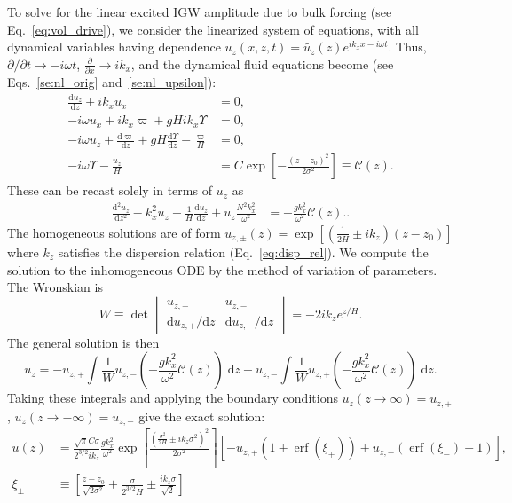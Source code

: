\documentclass[
        fleqn,
        usenatbib,
    ]{mnras}
\newcommand*{\rd}[2]{\frac{\mathrm{d}#1}{\mathrm{d}#2}}
\newcommand*{\rtd}[2]{\frac{\mathrm{d}^2#1}{\mathrm{d}#2^2}}
\newcommand*{\pd}[2]{\frac{\partial#1}{\partial#2}}
\newcommand*{\pdil}[2]{\partial#1/\partial#2}
\newcommand*{\rdil}[2]{\mathrm{d}#1/\mathrm{d}#2}
\newcommand*{\p}[1]{\left(#1\right)}
\newcommand*{\s}[1]{\left[#1\right]}
\DeclareMathOperator*{\erf}{erf}
\begin{document}
To solve for the linear excited IGW amplitude due to bulk forcing (see
Eq.~\eqref{eq:vol_drive}), we consider the linearized system of equations, with
all dynamical variables having dependence $u_z(x, z, t) = \tilde{u_z}(z)
e^{ik_xx - i\omega t}$. Thus, $\pdil{}{t} \to -i\omega t$, $\pd{}{x} \to ik_x$,
and the dynamical fluid
equations become (see Eqs.~\eqref{se:nl_orig} and~\eqref{se:nl_upsilon}):
\begin{align*}
    \rd{u_{z}}{z} + ik_xu_x &= 0,\\
    -i\omega u_x + ik_x \varpi + gHik_x \Upsilon &= 0,\\
    -i\omega u_{z} + \rd{\varpi}{z} + gH\rd{\Upsilon}{z}
        - \frac{\varpi}{H} &= 0,\\
    -i\omega \Upsilon - \frac{u_{z}}{H} &=
        C\exp\s{-\frac{(z - z_0)^2}{2\sigma^2}} \equiv \mathcal{C}(z).
\end{align*}
These can be recast solely in terms of $u_{z}$ as
\begin{align*}
     \rtd{u_{z}}{z} - k_x^2u_{z} - \frac{1}{H}\rd{u_{z}}{z}
        + u_{z}\frac{N^2k_x^2}{\omega^2} &=
    -\frac{gk_x^2}{\omega^2}\mathcal{C}(z).
        .\label{eq:narrow_inhomo}
\end{align*}
The homogeneous solutions are of form $u_{z,\pm}(z) = \exp\s{\p{\frac{1}{2H} \pm
ik_z}\p{z - z_0}}$ where $k_z$ satisfies the dispersion relation
(Eq.~\eqref{eq:disp_rel}). We compute the solution to the inhomogeneous ODE by
the method of variation of parameters. The Wronskian is
\begin{equation}
    W \equiv \det \begin{vmatrix}
        u_{z,+} & u_{z,-} \\[4pt]
        \rdil{u_{z,+}}{z} & \rdil{u_{z,-}}{z}
    \end{vmatrix} = -2ik_ze^{z/H}.
\end{equation}
The general solution is then
\begin{equation}
    u_z = -u_{z,+}\int \frac{1}{W} u_{z,-} \p{-\frac{gk_x^2}{\omega^2}
            \mathcal{C}(z)}\;\mathrm{d}z
        + u_{z,-}\int \frac{1}{W} u_{z,+} \p{-\frac{gk_x^2}{\omega^2}
            \mathcal{C}(z)}\;\mathrm{d}z.
\end{equation}
Taking these integrals and applying the boundary conditions $u_z\p{z \to \infty}
= u_{z,+}$, $u_z\p{z \to -\infty} = u_{z,-}$ give the exact solution:
\begin{align}
    u(z) &= \frac{\sqrt{\pi}C\sigma}{2^{3/2}ik_z}\frac{gk_x^2}{\omega^2}
            \exp\s{\frac{\p{\frac{\sigma^2}{2H} \pm ik_z\sigma^2}^2}{2\sigma^2}}
                \s{-u_{z,+}\p{1 + \erf\p{\xi_+}}
                    + u_{z,-} \p{\erf\p{\xi_-} - 1}},\\
    \xi_{\pm} &\equiv \s{\frac{z - z_0}{\sqrt{2\sigma^2}} +
        \frac{\sigma}{2^{3/2}H} \pm \frac{ik_z\sigma}{\sqrt{2}}}
\end{align}
\end{document}
